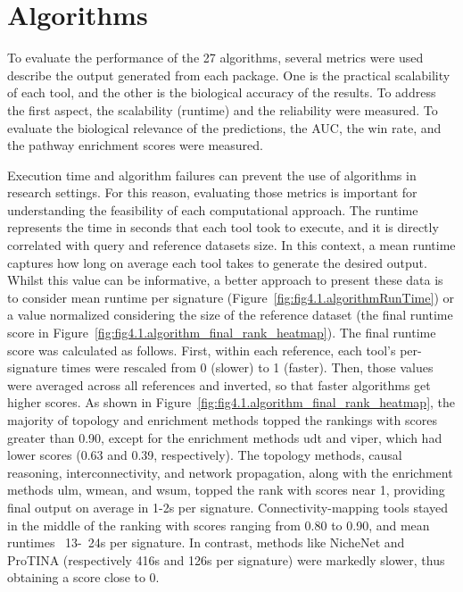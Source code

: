 \section{Algorithms} %
\label{sec:algorithms_results}

To evaluate the performance of the 27 algorithms, several metrics were used describe  the output generated from each package. One is the practical scalability of each tool, and the other is the biological accuracy of the results. To address the first aspect, the scalability (runtime) and the reliability were measured. To evaluate the biological relevance of the predictions, the AUC, the win rate, and the pathway enrichment scores were measured.

Execution time and algorithm failures can prevent the use of algorithms in research settings. For this reason, evaluating those metrics is important for understanding the feasibility of each computational approach. The runtime represents the time in seconds that each tool took to execute, and it is directly correlated with query and reference datasets size. In this context, a mean runtime captures how long on average each tool takes to generate the desired output. Whilst this value can be informative, a better approach to present these data is to consider mean runtime per signature (Figure~\ref{fig:fig4.1.algorithmRunTime}) or a value normalized considering the size of the reference dataset (the final runtime score in Figure~\ref{fig:fig4.1.algorithm_final_rank_heatmap}). The final runtime score was calculated as follows. First, within each reference, each tool's per-signature times were rescaled from 0 (slower) to 1 (faster). Then, those values were averaged across all references and inverted, so that faster algorithms get higher scores. As shown in Figure~\ref{fig:fig4.1.algorithm_final_rank_heatmap}, the majority of topology and enrichment methods topped the rankings with scores greater than 0.90, except for the enrichment methods udt and viper, which had lower scores (0.63 and 0.39, respectively). The topology methods, causal reasoning, interconnectivity, and network propagation, along with the enrichment methods ulm, wmean, and wsum, topped the rank with scores near 1, providing final output on average in 1-2s per signature. Connectivity-mapping tools stayed in the middle of the ranking with scores ranging from 0.80 to 0.90, and mean runtimes ~13-~24s per signature. In contrast, methods like NicheNet and ProTINA (respectively 416s and 126s per signature) were markedly slower, thus obtaining a score close to 0.

